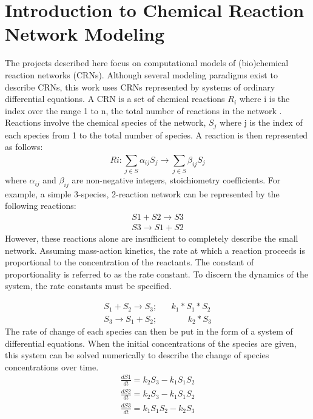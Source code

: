 \documentclass[12pt]{report}
\begin{document}
\section{Introduction to Chemical Reaction Network Modeling}
\label{section:intro_crn}
The projects described here focus on computational models of (bio)chemical reaction networks (CRNs). Although several modeling paradigms exist to describe CRNs, this work uses CRNs represented by systems of ordinary differential equations. A CRN is a set of chemical reactions $R_i$ where i is the index over the range 1 to n, the total number of reactions in the network . Reactions involve the chemical species of the network, $S_j$ where j is the index of each species from 1 to the total number of species. A reaction is then represented as follows:
\begin{equation*}
Ri: \sum_{j\in S}^{}\alpha_{ij}S_j\to \sum_{j\in S}^{}\beta_{ij}S_j
\end{equation*}
where $\alpha_{ij}$ and $\beta_{ij}$ are non-negative integers, stoichiometry coefficients. For example, a simple 3-species, 2-reaction network can be represented by the following reactions:
\begin{equation}
\begin{split}
S1 + S2 \to S3 \\
S3 \to S1 + S2
\end{split}
\end{equation}
However, these reactions alone are insufficient to completely describe the small network.  Assuming mass-action kinetics, the rate at which a reaction proceeds is proportional to the concentration of the reactants. The constant of proportionality is referred to as the rate constant. To discern the dynamics of the system, the rate constants must be specified.

\begin{equation}
\begin{split}
S_{1} + S_{2} \to S_{3}; \;\;\;\;\;\; k_1*S_{1}*S_{2}\\
S_{3} \to S_{1} + S_{2}; \;\;\;\;\;\;\;\;\;\;\;\;\; k_2*S_3
\end{split}
\end{equation}
The rate of change of each species can then be put in the form of a system of differential equations. When the initial concentrations of the species are given, this system can be solved numerically to describe the change of species concentrations over time.
\begin{equation}
\begin{split}
\frac{dS1}{dt}=k_2S_{3} - k_1S_1S_2\\
\frac{dS2}{dt}=k_2S_3 -k_1S_1S_2\\
\frac{dS3}{dt}=k_1S_1S_2 - k_2S_3
\end{split}
\end{equation}
\end{document}
